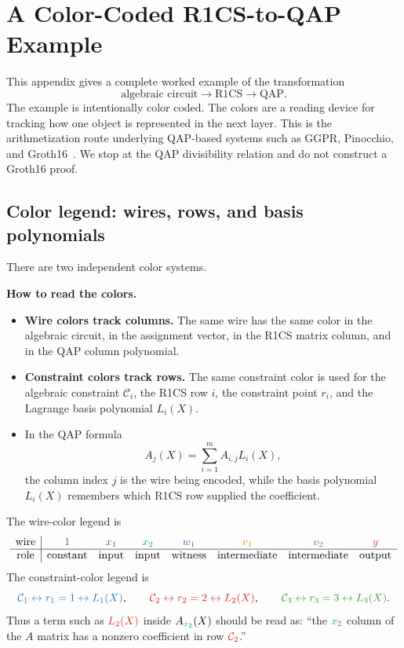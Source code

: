 \section{A Color-Coded R1CS-to-QAP Example}
\label{app:r1cs-qap-example}

This appendix gives a complete worked example of the transformation
\[
    \text{algebraic circuit}\longrightarrow \text{R1CS}\longrightarrow \text{QAP}.
\]
The example is intentionally color coded. The colors are a reading device for tracking how one object is represented in the next layer. This is the arithmetization route underlying QAP-based systems such as GGPR, Pinocchio, and Groth16~\cite{GennaroGentryParnoRaykova2013,ParnoHowellGentryRaykova2013,Groth2016}. We stop at the QAP divisibility relation and do not construct a Groth16 proof.

\subsection{Color legend: wires, rows, and basis polynomials}

There are two independent color systems.

\begin{tcolorbox}
\textbf{How to read the colors.}
\begin{itemize}[leftmargin=2em]
    \item \textbf{Wire colors track columns.} The same wire has the same color in the algebraic circuit, in the assignment vector, in the R1CS matrix column, and in the QAP column polynomial.
    \item \textbf{Constraint colors track rows.} The same constraint color is used for the algebraic constraint $\mathcal C_i$, the R1CS row $i$, the constraint point $r_i$, and the Lagrange basis polynomial $L_i(X)$.
    \item In the QAP formula
    \[
        A_j(X)=\sum_{i=1}^{m} A_{i,j} L_i(X),
    \]
    the column index $j$ is the wire being encoded, while the basis polynomial $L_i(X)$ remembers which R1CS row supplied the coefficient.
\end{itemize}
\end{tcolorbox}

The wire-color legend is
\[
\begin{array}{c|ccccccc}
\text{wire} & \constwire{1} & \xone{x_1} & \xtwo{x_2} & \wone{w_1} & \vone{v_1} & \vtwo{v_2} & \ywire{y} \\
\hline
\text{role} & \text{constant} & \text{input} & \text{input} & \text{witness} & \text{intermediate} & \text{intermediate} & \text{output}
\end{array}
\]
The constraint-color legend is
\[
    \rowone{\mathcal C_1\leftrightarrow r_1=1\leftrightarrow L_1(X)},
    \qquad
    \rowtwo{\mathcal C_2\leftrightarrow r_2=2\leftrightarrow L_2(X)},
    \qquad
    \rowthree{\mathcal C_3\leftrightarrow r_3=3\leftrightarrow L_3(X)}.
\]
Thus a term such as $\rowtwo{L_2(X)}$ inside $A_{\xtwo{x_2}}(X)$ should be read as: ``the $\xtwo{x_2}$ column of the $A$ matrix has a nonzero coefficient in row $\rowtwo{\mathcal C_2}$.''

